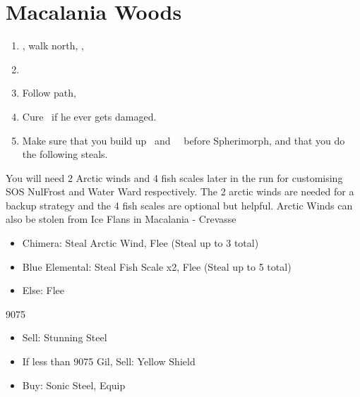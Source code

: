 \chapter{Macalania Woods}
\begin{enumerate}
	\item \sd, walk north, \sd, \save
	\item \formation{\tidus}{\rikku}{\auron}
	\item Follow path, 
	\item Cure \tidus\ if he ever gets damaged.
	\item Make sure that you build up \rikku\ and \yuna\ \od\ before Spherimorph, and that you do the following steals.
\end{enumerate}
\begin{encounters}
	You will need 2 Arctic winds and 4 fish scales later in the run for customising SOS NulFrost and Water Ward respectively. The 2 arctic winds are needed for a backup strategy and the 4 fish scales are optional but helpful. Arctic Winds can also be stolen from Ice Flans in Macalania - Crevasse
	\begin{itemize}
		\item Chimera: Steal Arctic Wind, Flee (Steal up to 3 total)
		\item Blue Elemental: Steal Fish Scale x2, Flee (Steal up to 5 total)
		\item Else: Flee
	\end{itemize}
\end{encounters}
\begin{shop}{9075}
	\begin{itemize}
		\item Sell: Stunning Steel
		\item If less than 9075 Gil, Sell: Yellow Shield
		\item Buy: Sonic Steel, Equip
	\end{itemize}
\end{shop}
